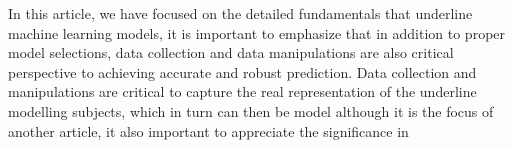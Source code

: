 
\par
In this article, we have focused on the detailed fundamentals that underline machine learning models, it is important to emphasize that in addition to proper model selections, data collection and data manipulations are also critical perspective to achieving accurate and robust prediction. Data collection and manipulations are critical to capture the real representation of the underline modelling subjects, which in turn can then be model although it is the focus of another article, it also important to appreciate the significance in 
\par 
